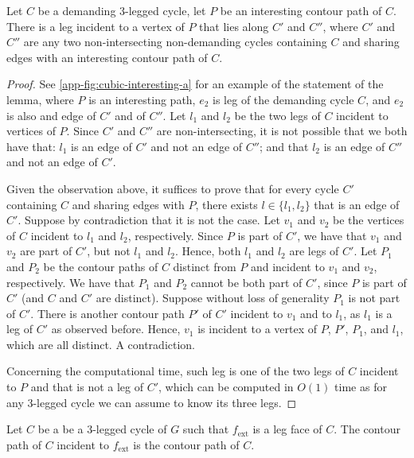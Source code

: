 \documentclass[runningheads]{llncs}
\newcommand{\ext}{\operatorname{ext}}
\let\emph\relax\DeclareTextFontCommand{\emph}{\color{dark blue}\em}
\begin{document}
\begin{lemma}
\label{app-le:cubic-useAleg}
Let $C$ be a demanding 3-legged cycle, let $P$ be an interesting contour path of $C$. There is a leg incident to a vertex of $P$ that lies along $C'$ and $C''$, where $C'$ and $C''$ are any two non-intersecting non-demanding cycles containing $C$ and sharing edges with an interesting contour path of $C$.
\end{lemma}
\begin{proof}
See \cref{app-fig:cubic-interesting-a} for an example of the statement of the lemma, where $P$ is an interesting path, $e_2$ is leg of the demanding cycle $C$, and $e_2$ is also and edge of $C'$ and of $C''$. Let $l_1$ and $l_2$ be the two legs of $C$ incident to vertices of $P$. Since $C'$ and $C''$ are non-intersecting, it is not possible that we both have that: $l_1$ is an edge of $C'$ and not an edge of $C''$; and that $l_2$ is an edge of $C''$ and not an edge of $C'$. 

Given the observation above, it suffices to prove that for every cycle $C'$ containing $C$ and sharing edges with $P$, there exists  $l\in \{l_1,l_2\}$ that is an edge of $C'$. Suppose by contradiction that it is not the case. Let $v_1$ and $v_2$ be the vertices of $C$ incident to $l_1$ and $l_2$, respectively. Since $P$ is part of $C'$, we have that $v_1$ and $v_2$ are part of $C'$, but not $l_1$ and $l_2$. Hence, both $l_1$ and $l_2$ are legs of $C'$. Let $P_1$ and $P_2$ be the contour paths of $C$ distinct from $P$ and incident to $v_1$ and $v_2$, respectively. We have that $P_1$ and $P_2$ cannot be both part of $C'$, since $P$ is part of $C'$ (and $C$ and $C'$ are distinct). Suppose without loss of generality $P_1$ is not part of $C'$.  There is another contour path $P'$ of $C'$ incident to $v_1$ and to $l_1$, as $l_1$ is a leg of $C'$ as observed before. Hence, $v_1$ is incident to a vertex of $P$, $P'$, $P_1$, and $l_1$, which are all distinct. A contradiction. 



Concerning the computational time, such leg is one of the two legs of $C$ incident to $P$ and that is not a leg of $C'$, which can be computed in $O(1)$ time as for any 3-legged cycle we can assume to know its three legs.
\end{proof}



Let $C$ be a be a 3-legged cycle of $G$ such that $f_{\ext}$ is a leg face of $C$. The contour path of $C$ incident to $f_{\ext}$ is the \emph{exposed} contour path of $C$. 
\end{document}
